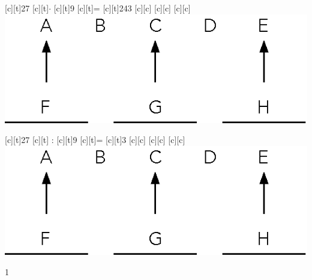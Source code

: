 \documentclass[a4paper,11pt]{report}
\begin{document}
\begin{exop}
{\bigskip
\begin{minipage}{0,45\linewidth}
\begin{center}
\begin{psfrags}
[c][t]{27}
[c][t]{$\cdot$}
[c][t]{9}
[c][t]{=}
[c][t]{243}
[c][c]{{{{\color{blue} }}}}
[c][c]{{{{\color{blue} }}}}
[c][c]{{{{\color{blue} }}}}
\includegraphics[scale=1]{media/no-30/vocabulaire4op.eps}
\end{psfrags}
\end{center}
\end{minipage}
\hfill
\begin{minipage}{0,45\linewidth}
\begin{center}
\begin{psfrags}
[c][t]{27}
[c][t]{ : }
[c][t]{9}
[c][t]{=}
[c][t]{3}
[c][c]{{{{\color{blue} }}}}%
[c][c]{{{{\color{blue} }}}}%
[c][c]{{{{\color{blue} }}}}
\includegraphics[scale=1]{media/no-30/vocabulaire4op.eps}
\end{psfrags}
\end{center}
\end{minipage}}{1}
\end{exop}
\end{document}
